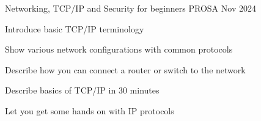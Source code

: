 \documentclass[Screen16to9,17pt]{foils}
\begin{document}









\mytitlepage
{Networking, TCP/IP and Security for beginners}
{PROSA Nov 2024}


\hlkprofiluk



\begin{list2}
\item Introduce basic TCP/IP terminology
\item Show various network configurations with common protocols
\item Describe how you can connect a router or switch to the network
\item Describe basics of TCP/IP in 30 minutes
\item Let you get some hands on with IP protocols
\end{list2}
\end{document}
